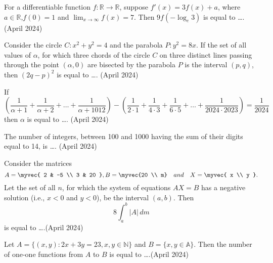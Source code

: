 \iffalse
\title{Assignment}
\author{EE24BTECH11035}
\section{integer}
\fi

\item For a differentiable function $f : \mathbb{R} \to \mathbb{R}$, suppose $f'(x) = 3f(x) + a$, where $a \in \mathbb{R}$,$f(0) = 1$ and $\lim_{x \to \infty} f(x) = 7$. Then $9f(-\log_e 3)$ is equal to \dots.\hfill{(April 2024)}

\item Consider the circle $C: x^2 + y^2 = 4$ and the parabola $P: y^2 = 8x$. If the set of all values of $\alpha$, for which three chords of the circle $C$ on three distinct lines passing through the point $(\alpha, 0)$ are bisected by the parabola $P$ is the interval $(p, q)$, then $(2q - p)^2$ is equal to \dots.
	\hfill{(April 2024)}
\item If
\begin{equation*}
\left( \frac{1}{\alpha + 1} + \frac{1}{\alpha + 2} + \ldots + \frac{1}{\alpha + 1012} \right) 
- \left( \frac{1}{2 \cdot 1} + \frac{1}{4 \cdot 3} + \frac{1}{6 \cdot 5} + \ldots + \frac{1}{2024 \cdot 2023} \right) 
= \frac{1}{2024}
\end{equation*}
then $\alpha$ is equal to \dots.
\hfill{(April 2024)}
\item The number of integers, between 100 and 1000 having the sum of their digits equal to 14, is \dots.
\hfill{(April 2024)}
\item Consider the matrices 
\begin{equation*}
A = \myvec{ 2 & -5 \\ 3 & 20 },B=\myvec{20 \\ m}\quad and\quad X = \myvec{ x \\ y }.
\end{equation*}
Let the set of all $n$, for which the system of equations $AX = B$ has a negative solution (i.e., $x < 0$ and $y < 0$), be the interval $(a, b)$. Then 
\begin{equation*}
8\int_a^b  |A|\, dm
\end{equation*}
is equal to \dots.\hfill{(April 2024)}
\item Let $A = \{(x, y): 2x + 3y = 23, x, y \in \mathbb{N}\}$ and $B = \{x, y \in \mathbb{A}\}$. Then the number of one-one functions from $A$ to $B$ is equal to \dots.\hfill{(April 2024)}

